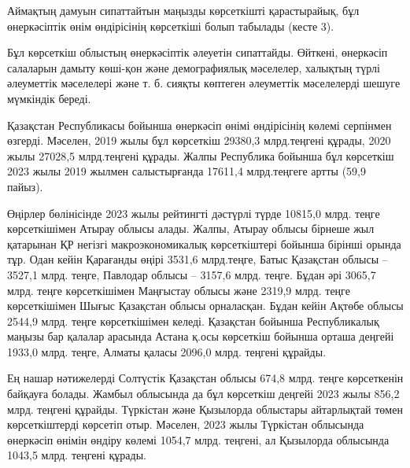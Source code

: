 \begin{multicols}{2}
Аймақтың дамуын сипаттайтын маңызды көрсеткішті қарастырайық, бұл
өнеркәсіптік өнім өндірісінің көрсеткіші болып табылады (кесте 3).

Бұл көрсеткіш облыстың өнеркәсіптік әлеуетін сипаттайды. Өйткені,
өнеркәсіп салаларын дамыту көші-қон және демографиялық мәселелер,
халықтың түрлі әлеуметтік мәселелері және т. б. сияқты көптеген
әлеуметтік мәселелерді шешуге мүмкіндік береді.

Қазақстан Республикасы бойынша өнеркәсіп өнімі өндірісінің көлемі
серпінмен өзгерді. Мәселен, 2019 жылы бұл көрсеткіш 29380,3 млрд.теңгені
құрады, 2020 жылы 27028,5 млрд.теңгені құрады. Жалпы Республика бойынша
бұл көрсеткіш 2023 жылы 2019 жылмен салыстырғанда 17611,4 млрд.теңгеге
артты (59,9 пайыз).

Өңірлер бөлінісінде 2023 жылы рейтингті дәстүрлі түрде 10815,0 млрд.
теңге көрсеткішімен Атырау облысы алады. Жалпы, Атырау облысы бірнеше
жыл қатарынан ҚР негізгі макроэкономикалық көрсеткіштері бойынша бірінші
орында тұр. Одан кейін Қарағанды өңірі 3531,6 млрд.теңге, Батыс
Қазақстан облысы -- 3527,1 млрд. теңге, Павлодар облысы -- 3157,6 млрд.
теңге. Бұдан әрі 3065,7 млрд. теңге көрсеткішімен Маңғыстау облысы және
2319,9 млрд. теңге көрсеткішімен Шығыс Қазақстан облысы орналасқан.
Бұдан кейін Ақтөбе облысы 2544,9 млрд. теңге көрсеткішімен келеді.
Қазақстан бойынша Республикалық маңызы бар қалалар арасында Астана қ.осы
көрсеткіш бойынша орташа деңгейі 1933,0 млрд. теңге, Алматы қаласы
2096,0 млрд. теңгені құрайды.

Ең нашар нәтижелерді Солтүстік Қазақстан облысы 674,8 млрд. теңге
көрсеткенін байқауға болады. Жамбыл облысында да бұл көрсеткіш деңгейі
2023 жылы 856,2 млрд. теңгені құрайды. Түркістан және Қызылорда
облыстары айтарлықтай төмен көрсеткіштерді көрсетіп отыр. Мәселен, 2023
жылы Түркістан облысында өнеркәсіп өнімін өндіру көлемі 1054,7 млрд.
теңгені, ал Қызылорда облысында 1043,5 млрд. теңгені құрады.
\end{multicols}

